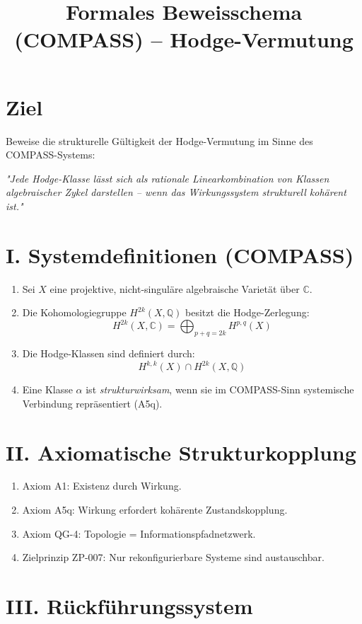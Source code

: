 \documentclass[12pt]{article}
\title{Formales Beweisschema (COMPASS) -- Hodge-Vermutung}
\date{}
\begin{document}
\maketitle

\section*{Ziel}

Beweise die strukturelle Gültigkeit der Hodge-Vermutung im Sinne des COMPASS-Systems:

\textit{"Jede Hodge-Klasse lässt sich als rationale Linearkombination von Klassen algebraischer Zykel darstellen – wenn das Wirkungssystem strukturell kohärent ist."}

\section*{I. Systemdefinitionen (COMPASS)}

\begin{enumerate}
  \item Sei $X$ eine projektive, nicht-singuläre algebraische Varietät über $\mathbb{C}$.
  \item Die Kohomologiegruppe $H^{2k}(X, \mathbb{Q})$ besitzt die Hodge-Zerlegung:
  \[
  H^{2k}(X, \mathbb{C}) = \bigoplus_{p+q=2k} H^{p,q}(X)
  \]
  \item Die Hodge-Klassen sind definiert durch:
  \[
  H^{k,k}(X) \cap H^{2k}(X, \mathbb{Q})
  \]
  \item Eine Klasse $\alpha$ ist \emph{strukturwirksam}, wenn sie im COMPASS-Sinn systemische Verbindung repräsentiert (A5q).
\end{enumerate}

\section*{II. Axiomatische Strukturkopplung}

\begin{enumerate}
  \item Axiom A1: Existenz durch Wirkung.
  \item Axiom A5q: Wirkung erfordert kohärente Zustandskopplung.
  \item Axiom QG-4: Topologie = Informationspfadnetzwerk.
  \item Zielprinzip ZP-007: Nur rekonfigurierbare Systeme sind austauschbar.
\end{enumerate}

\section*{III. Rückführungssystem}
\end{document}
